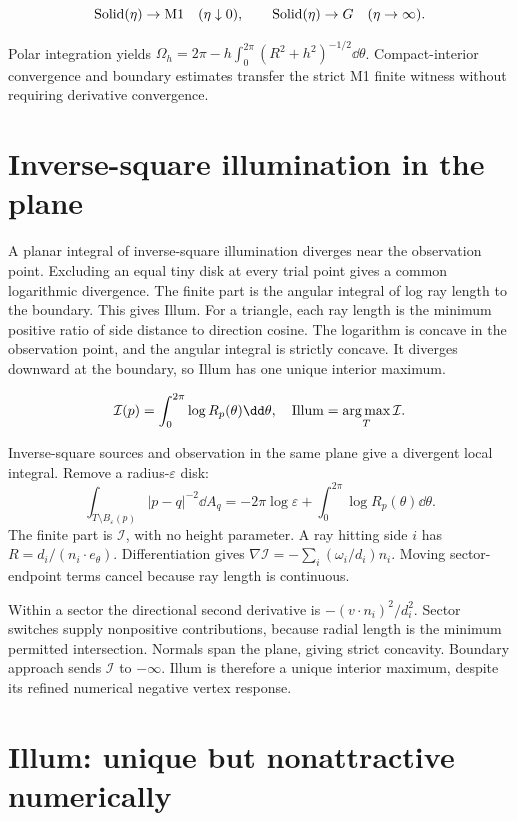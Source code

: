\documentclass[11pt,oneside,openany]{book}
\newcommand{\argmax}{\operatorname*{arg\,max}}\newcommand{\argmin}{\operatorname*{arg\,min}}
\begin{document}
\[{\rm Solid}(\eta)\to{\rm M1}\quad(\eta\downarrow0),\qquad {\rm Solid}(\eta)\to G\quad(\eta\to\infty).\]


Polar integration yields
$\Omega_h=2\pi-h\int_0^{2\pi}(R^2+h^2)^{-1/2}\dd\theta$.
Compact-interior convergence and boundary estimates transfer the
strict M1 finite witness without requiring derivative convergence.



\section{Inverse-square illumination in the plane}\label{sec:slide79}

A planar integral of inverse-square illumination diverges near the observation point. Excluding an equal tiny disk at every trial point gives a common logarithmic divergence. The finite part is the angular integral of log ray length to the boundary. This gives Illum. For a triangle, each ray length is the minimum positive ratio of side distance to direction cosine. The logarithm is concave in the observation point, and the angular integral is strictly concave. It diverges downward at the boundary, so Illum has one unique interior maximum.


\[\mathcal I(p)=\int_0^{2\pi}\log R_p(\theta)\dd\theta,\quad {\rm Illum}=\argmax_T\mathcal I.\]



Inverse-square sources and observation in the same plane give a
divergent local integral. Remove a radius-$\varepsilon$ disk:
\[
\int_{T\setminus B_\varepsilon(p)}|p-q|^{-2}\dd A_q
=-2\pi\log\varepsilon+\int_0^{2\pi}\log R_p(\theta)\dd\theta.
\]
The finite part is $\mathcal I$, with no height parameter.
A ray hitting side $i$ has $R=d_i/(n_i\cdot e_\theta)$.
Differentiation gives
$\nabla\mathcal I=-\sum_i(\omega_i/d_i)n_i$.
Moving sector-endpoint terms cancel because ray length is continuous.

Within a sector the directional second derivative is
$-(v\cdot n_i)^2/d_i^2$. Sector switches supply nonpositive
contributions, because radial length is the minimum permitted
intersection. Normals span the plane, giving strict concavity.
Boundary approach sends $\mathcal I$ to $-\infty$.
Illum is therefore a unique interior maximum, despite its refined
numerical negative vertex response.




\section{Illum: unique but nonattractive numerically}\label{sec:slide80}
\end{document}
